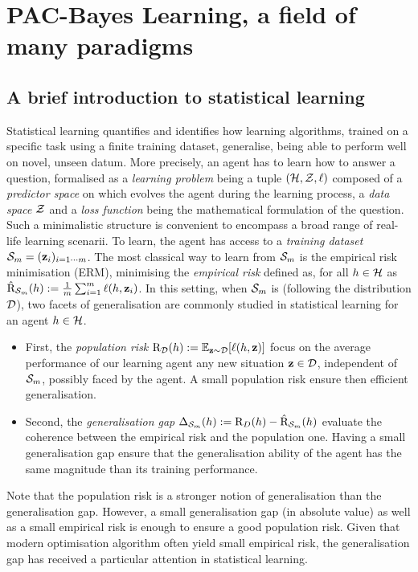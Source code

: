 \chapter[PAC-Bayes Learning, a field of many paradigms]{PAC-Bayes Learning, a field of many paradigms}
\label{chap:intro-pac-bayes}

\minitoc

\addchapterlof
\addchapterloa
\addchapterloe

\section{A brief introduction to statistical learning}
\label{sec: intro-stat-learning}
Statistical learning \citep{vapnik1999overview,james2013introduction} quantifies and identifies how learning algorithms, trained on a specific task using a finite training dataset, generalise, \ie being able to perform well on novel, unseen datum. More precisely, an agent has to learn how to answer a question, formalised as a \emph{learning problem} being a tuple $(\H,\Z,\ell)$ composed of a \emph{predictor space} on which evolves the agent during the learning process, a \emph{data space} $\Z$ and a \emph{loss function} being the mathematical formulation of the question. Such a minimalistic structure is convenient to encompass a broad range of real-life learning scenarii. To learn, the agent has access to a \emph{training dataset} $\S_m= (\z_i)_{i=1\cdots m}$. The most classical way to learn from $\Sm$ is the empirical risk minimisation (ERM), minimising the \emph{empirical risk} defined as, for all $h\in\H$ as $\Riskhat_{\Sm}(h):= \frac{1}{m} \sum_{i=1}^m \ell(h,\z_i)$. In this setting, when $\S_m$ is \iid (following the distribution $\D$), two facets of generalisation are commonly studied in statistical learning for an agent $h\in\H$.

\begin{itemize}
    \item First, the \emph{population risk} $\Risk_\D(h):= \mathbb{E}_{\z\sim\D}[\ell(h,\z)]$ focus on the average performance of our learning agent \wrt any new situation $\z\in\D$, independent of $\S_m$, possibly faced by the agent. A small population risk ensure then efficient generalisation.   
    \item Second, the \emph{generalisation gap}  $\Delta_{\Sm}(h):= \Risk_D(h) - \Riskhat_{\Sm}(h)$ evaluate the coherence between the empirical risk and the population one. Having a small generalisation gap ensure that the generalisation ability of the agent has the same magnitude than its training performance. 
\end{itemize}
Note that the population risk is a stronger notion of generalisation than the generalisation gap. However, a small generalisation gap (in absolute value) as well as a small empirical risk is enough to ensure a good population risk. Given that modern optimisation algorithm often yield small empirical risk, the generalisation gap has received a particular attention in statistical learning. 

